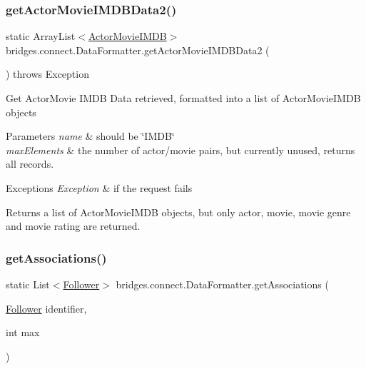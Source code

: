 \subsubsection{\texorpdfstring{get\+Actor\+Movie\+I\+M\+D\+B\+Data2()}{getActorMovieIMDBData2()}}
{\footnotesize\ttfamily static Array\+List$<$\hyperlink{classbridges_1_1data__src__dependent_1_1_actor_movie_i_m_d_b}{Actor\+Movie\+I\+M\+DB}$>$ bridges.\+connect.\+Data\+Formatter.\+get\+Actor\+Movie\+I\+M\+D\+B\+Data2 (\begin{DoxyParamCaption}{ }\end{DoxyParamCaption}) throws Exception\hspace{0.3cm}{\ttfamily [static]}}

Get Actor\+Movie I\+M\+DB Data retrieved, formatted into a list of Actor\+Movie\+I\+M\+DB objects


\begin{DoxyParams}{Parameters}
{\em name} & should be \char`\"{}\+I\+M\+D\+B\char`\"{} \\
\hline
{\em max\+Elements} & the number of actor/movie pairs, but currently unused, returns all records. \\
\hline
\end{DoxyParams}

\begin{DoxyExceptions}{Exceptions}
{\em Exception} & if the request fails\\
\hline
\end{DoxyExceptions}
\begin{DoxyReturn}{Returns}
a list of Actor\+Movie\+I\+M\+DB objects, but only actor, movie, movie genre and movie rating are returned. 
\end{DoxyReturn}
\hypertarget{classbridges_1_1connect_1_1_data_formatter_a3877fbdef4320f03dba7f2a6832adfbb}{}\label{classbridges_1_1connect_1_1_data_formatter_a3877fbdef4320f03dba7f2a6832adfbb} 
\subsubsection{\texorpdfstring{get\+Associations()}{getAssociations()}\hspace{0.1cm}{\footnotesize\ttfamily [1/5]}}
{\footnotesize\ttfamily static List$<$\hyperlink{classbridges_1_1data__src__dependent_1_1_follower}{Follower}$>$ bridges.\+connect.\+Data\+Formatter.\+get\+Associations (\begin{DoxyParamCaption}\item[{\hyperlink{classbridges_1_1data__src__dependent_1_1_follower}{Follower}}]{identifier,  }\item[{int}]{max }\end{DoxyParamCaption})\hspace{0.3cm}{\ttfamily [static]}}

